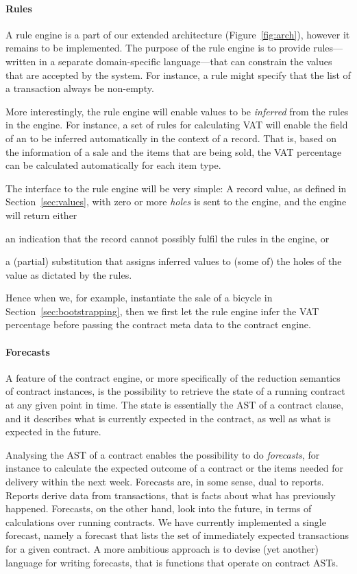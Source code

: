 \paragraph{Rules}
A rule engine is a part of our extended architecture
(Figure~\ref{fig:arch}), however it remains to be implemented. The
purpose of the rule engine is to provide rules---written in a separate
domain-specific language---that can constrain the values that are
accepted by the system. For instance, a rule might specify that the
 list of a  transaction always
be non-empty.

More interestingly, the rule engine will enable values
to be \emph{inferred} from the rules in the engine. For instance, a
set of rules for calculating VAT will enable the field
 of an  to be inferred
automatically in the context of a  record. That is,
based on the information of a sale and the items that are being sold,
the VAT percentage can be calculated automatically for each item
type.

The interface to the rule engine will be very simple: A record value,
as defined in Section~\ref{sec:values}, with zero or more \emph{holes}
is sent to the engine, and the engine will return either
\begin{inparaenum}[(i)]
\item an indication that the record cannot possibly fulfil the rules in the
  engine, or
\item a (partial) substitution that assigns inferred values to (some
  of) the holes of the value as dictated by the rules.
\end{inparaenum}
Hence when we, for example, instantiate the sale of a bicycle in
Section~\ref{sec:bootstrapping}, then we first let the rule engine
infer the VAT percentage before passing the contract meta data to the
contract engine.

\paragraph{Forecasts}
A feature of the contract engine, or more specifically of the reduction
semantics of contract instances, is the possibility to retrieve the
state of a running contract at any given point in time. The state is
essentially the AST of a contract clause, and it describes what is
currently expected in the contract, as well as what is expected in the
future.

Analysing the AST of a contract enables the possibility to do
\emph{forecasts}, for instance to calculate the expected outcome of a
contract or the items needed for delivery within the next
week. Forecasts are, in some sense, dual to reports. Reports derive
data from transactions, that is facts about what has previously
happened. Forecasts, on the other hand, look into the future, in terms
of calculations over running contracts. We have currently implemented
a single forecast, namely a forecast that lists the set of
immediately expected transactions for a given contract. A more
ambitious approach is to devise (yet another) language for writing
forecasts, that is functions that operate on contract ASTs.

